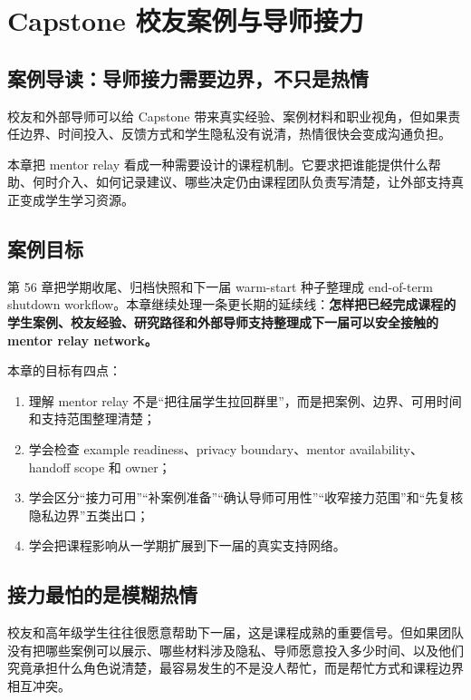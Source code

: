 \chapter{Capstone 校友案例与导师接力}

\section{案例导读：导师接力需要边界，不只是热情}

校友和外部导师可以给 Capstone 带来真实经验、案例材料和职业视角，但如果责任边界、时间投入、反馈方式和学生隐私没有说清，热情很快会变成沟通负担。

本章把 mentor relay 看成一种需要设计的课程机制。它要求把谁能提供什么帮助、何时介入、如何记录建议、哪些决定仍由课程团队负责写清楚，让外部支持真正变成学生学习资源。

\section{案例目标}

第 56 章把学期收尾、归档快照和下一届 warm-start 种子整理成 end-of-term shutdown workflow。本章继续处理一条更长期的延续线：\textbf{怎样把已经完成课程的学生案例、校友经验、研究路径和外部导师支持整理成下一届可以安全接触的 mentor relay network。}

本章的目标有四点：

\begin{enumerate}
    \item 理解 mentor relay 不是“把往届学生拉回群里”，而是把案例、边界、可用时间和支持范围整理清楚；
    \item 学会检查 example readiness、privacy boundary、mentor availability、handoff scope 和 owner；
    \item 学会区分“接力可用”“补案例准备”“确认导师可用性”“收窄接力范围”和“先复核隐私边界”五类出口；
    \item 学会把课程影响从一学期扩展到下一届的真实支持网络。
\end{enumerate}

\section{接力最怕的是模糊热情}

校友和高年级学生往往很愿意帮助下一届，这是课程成熟的重要信号。但如果团队没有把哪些案例可以展示、哪些材料涉及隐私、导师愿意投入多少时间、以及他们究竟承担什么角色说清楚，最容易发生的不是没人帮忙，而是帮忙方式和课程边界相互冲突。


